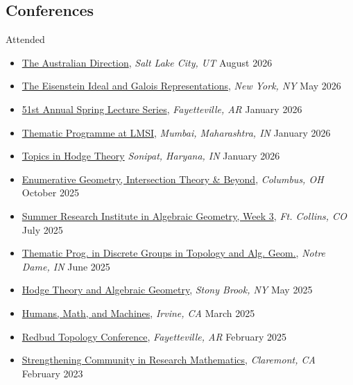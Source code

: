 \documentclass[margin,line]{res}
\begin{document}
\begin{resume}
\section{\sc Conferences}
Attended
\begin{itemize}
  \renewcommand\labelitemi{--}
  \item \href{https://seanpkh.github.io/australian-direction.html}{The Australian Direction}, \emph{Salt Lake City, UT} \hfill August 2026
  \item \href{https://www.simonsfoundation.org/event/mps-conference-on-the-eisenstein-ideal-and-galois-representations-looking-forward-after-50-years/}{The Eisenstein Ideal and Galois Representations}, \emph{New York, NY} \hfill May 2026
  \item \href{https://math.uark.edu/research/spring-lecture-series/spring-lecture-series-archives.php}{51st Annual Spring Lecture Series}, \emph{Fayetteville, AR} \hfill January 2026 
  \item \href{https://lmsi.org/programmes/thematic-programme-on-rational-points/}{Thematic Programme at LMSI}, \emph{Mumbai, Maharashtra, IN} \hfill January 2026
  \item \href{https://www.ashoka.edu.in/event/topics-in-hodge-theory/}{Topics in Hodge Theory} \emph{Sonipat, Haryana, IN} \hfill January 2026
  \item \href{https://www.gary-fest.org/}{Enumerative  Geometry, Intersection Theory \& Beyond}, \emph{Columbus, OH} \hfill October 2025
  \item \href{https://sites.google.com/view/2025summerinstitute/home}{Summer Research Institute in Algebraic Geometry, Week 3}, \emph{Ft. Collins, CO} \hfill July 2025
  \item \href{https://sites.nd.edu/cmnd2025-thematic-program/}{Thematic Prog. in Discrete Groups in Topology and Alg. Geom.}, \emph{Notre Dame, IN} \hfill June 2025
  \item \href{https://sites.google.com/view/markdecataldo60/home}{Hodge Theory and Algebraic Geometry}, \emph{Stony Brook, NY} \hfill May 2025
  \item \href{www.lps.uci.edu/workshops/aimath2025.php}{Humans, Math, and Machines}, \emph{Irvine, CA} \hfill March 2025
  \item \href{https://redbud.uark.edu/}{Redbud Topology Conference}, \emph{Fayetteville, AR} \hfill February 2025
  \item \href{https://www.pomona.edu/academics/departments/mathematics-statistics/events-colloquia/conference-strengthening-community-research-mathematics}{Strengthening Community in Research Mathematics}, {\em  Claremont, CA} \hfill February 2023

\end{itemize}
\end{resume}
\end{document}
